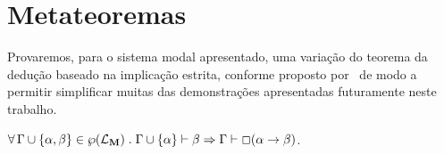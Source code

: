\section{Metateoremas}
    Provaremos, para o sistema modal apresentado, uma variação do teorema da dedução baseado na implicação estrita, conforme proposto por~\cite{Marcus} de modo a permitir simplificar muitas das demonstrações apresentadas futuramente neste trabalho.

    \begin{theorem}
        $\forall\,\Gamma\cup\{\alpha,\beta\}\in\wp(\mathcal{L}_\mathbf{M})\mathrel{.}\Gamma\cup\{\alpha\}\vdash\beta\Rightarrow  \Gamma\vdash\Box(\alpha\to\beta)$.
    \end{theorem}

